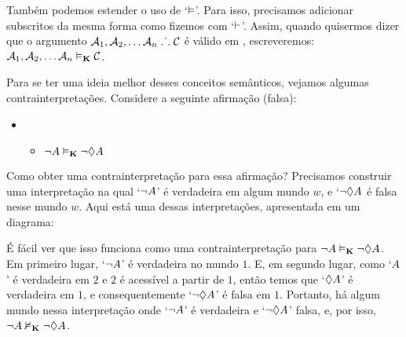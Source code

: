  Também podemos estender o uso de `$\vDash$'. Para isso, precisamos adicionar subscritos da mesma forma como fizemos com `$\vdash$'. Assim, quando quisermos dizer que o argumento $\mathcal{A}_1,\mathcal{A}_2, \dots \mathcal{A}_n\mathrel{\ldotp\dot{}\,\ldotp}\mathcal{C}$  é válido em \mlK, escreveremos: $\mathcal{A}_1,\mathcal{A}_2, \dots \mathcal{A}_n\vDash_{\mathbf{K}}\mathcal{C}$. 


Para se ter uma ideia melhor desses conceitos semânticos, vejamos algumas contrainterpretações. Considere a seguinte afirmação (falsa):

\begin{itemize}
	\item[]
	      \begin{itemize}
		      \item[]$\neg A\vDash_{\mathbf{K}} \neg \Diamond A$
	      \end{itemize}
\end{itemize}
Como obter uma contrainterpretação para essa afirmação? Precisamos construir uma interpretação na qual `$\neg A$' é verdadeira em algum mundo $w$, e `$\neg\Diamond A$ é falsa   nesse mundo $w$. Aqui está uma dessas interpretações, apresentada em um diagrama:
\begin{center}
\end{center}
É fácil ver que isso funciona como uma contrainterpretação para  $\neg A\vDash_{\mathbf{K}}\neg\Diamond A$. Em primeiro lugar, `$\neg A$' é verdadeira no mundo $1$. 
E, em segundo lugar, como `$A$' é verdadeira em $2$ e $2$ é acessível a partir de $1$, então temos que `$\Diamond A$' é verdadeira em $1$, e consequentemente `$\neg\Diamond A$'   é falsa em $1$. 
Portanto, há algum mundo nessa interpretação onde `$\neg A$' é verdadeira e `$\neg\Diamond A$'  falsa, e, por isso,     
$\neg A\nvDash_{\mathbf{K}} \neg \Diamond A$.


